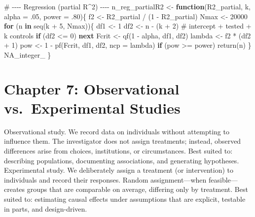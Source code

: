 \documentclass[
  letterpaper,
  DIV=11,
  numbers=noendperiod]{scrreprt}
\newenvironment{Shaded}{\begin{snugshade}}{\end{snugshade}}
\newcommand{\AttributeTok}[1]{\textcolor[rgb]{0.40,0.45,0.13}{#1}}
\newcommand{\CommentTok}[1]{\textcolor[rgb]{0.37,0.37,0.37}{#1}}
\newcommand{\ConstantTok}[1]{\textcolor[rgb]{0.56,0.35,0.01}{#1}}
\newcommand{\ControlFlowTok}[1]{\textcolor[rgb]{0.00,0.23,0.31}{\textbf{#1}}}
\newcommand{\DecValTok}[1]{\textcolor[rgb]{0.68,0.00,0.00}{#1}}
\newcommand{\FunctionTok}[1]{\textcolor[rgb]{0.28,0.35,0.67}{#1}}
\newcommand{\NormalTok}[1]{\textcolor[rgb]{0.00,0.23,0.31}{#1}}
\newcommand{\OtherTok}[1]{\textcolor[rgb]{0.00,0.23,0.31}{#1}}
\newcommand{\SpecialCharTok}[1]{\textcolor[rgb]{0.37,0.37,0.37}{#1}}
\begin{document}
\begin{Shaded}
\begin{Highlighting}[]
\CommentTok{\# {-}{-}{-}{-} Regression (partial R\^{}2) {-}{-}{-}{-}}
\NormalTok{n\_reg\_partialR2 }\OtherTok{\textless{}{-}} \ControlFlowTok{function}\NormalTok{(R2\_partial, k, }\AttributeTok{alpha =}\NormalTok{ .}\DecValTok{05}\NormalTok{, }\AttributeTok{power =}\NormalTok{ .}\DecValTok{80}\NormalTok{)\{}
\NormalTok{  f2 }\OtherTok{\textless{}{-}}\NormalTok{ R2\_partial }\SpecialCharTok{/}\NormalTok{ (}\DecValTok{1} \SpecialCharTok{{-}}\NormalTok{ R2\_partial)}
\NormalTok{  Nmax }\OtherTok{\textless{}{-}} \DecValTok{20000}
  \ControlFlowTok{for}\NormalTok{ (n }\ControlFlowTok{in} \FunctionTok{seq}\NormalTok{(k }\SpecialCharTok{+} \DecValTok{5}\NormalTok{, Nmax))\{}
\NormalTok{    df1 }\OtherTok{\textless{}{-}} \DecValTok{1}
\NormalTok{    df2 }\OtherTok{\textless{}{-}}\NormalTok{ n }\SpecialCharTok{{-}}\NormalTok{ (k }\SpecialCharTok{+} \DecValTok{2}\NormalTok{) }\CommentTok{\# intercept + tested + k controls}
    \ControlFlowTok{if}\NormalTok{ (df2 }\SpecialCharTok{\textless{}=} \DecValTok{0}\NormalTok{) }\ControlFlowTok{next}
\NormalTok{    Fcrit }\OtherTok{\textless{}{-}} \FunctionTok{qf}\NormalTok{(}\DecValTok{1} \SpecialCharTok{{-}}\NormalTok{ alpha, df1, df2)}
\NormalTok{    lambda }\OtherTok{\textless{}{-}}\NormalTok{ f2 }\SpecialCharTok{*}\NormalTok{ (df2 }\SpecialCharTok{+} \DecValTok{1}\NormalTok{)}
\NormalTok{    pow }\OtherTok{\textless{}{-}} \DecValTok{1} \SpecialCharTok{{-}} \FunctionTok{pf}\NormalTok{(Fcrit, df1, df2, }\AttributeTok{ncp =}\NormalTok{ lambda)}
    \ControlFlowTok{if}\NormalTok{ (pow }\SpecialCharTok{\textgreater{}=}\NormalTok{ power) }\FunctionTok{return}\NormalTok{(n)}
\NormalTok{  \}}
  \ConstantTok{NA\_integer\_}
\NormalTok{\}}
\end{Highlighting}
\end{Shaded}


\chapter{Chapter 7: Observational vs.~Experimental
Studies}\label{chapter-7-observational-vs.-experimental-studies}

Observational study. We record data on individuals without attempting to
influence them. The investigator does not assign treatments; instead,
observed differences arise from choices, institutions, or circumstances.
Best suited to: describing populations, documenting associations, and
generating hypotheses. Experimental study. We deliberately assign a
treatment (or intervention) to individuals and record their responses.
Random assignment---when feasible---creates groups that are comparable
on average, differing only by treatment. Best suited to: estimating
causal effects under assumptions that are explicit, testable in parts,
and design-driven.
\end{document}
